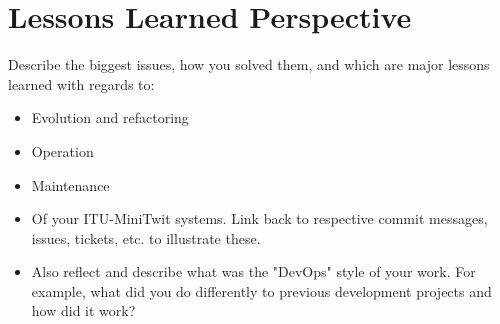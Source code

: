 \section{Lessons Learned Perspective}

Describe the biggest issues, how you solved them, and which are major lessons learned with regards to:
\begin{itemize}
  \item Evolution and refactoring
  \item Operation
  \item Maintenance
  \item Of your ITU-MiniTwit systems. Link back to respective commit messages, issues, tickets, etc. to illustrate these.
  \item Also reflect and describe what was the "DevOps" style of your work. For example, what did you do differently to previous development projects and how did it work?

\end{itemize}